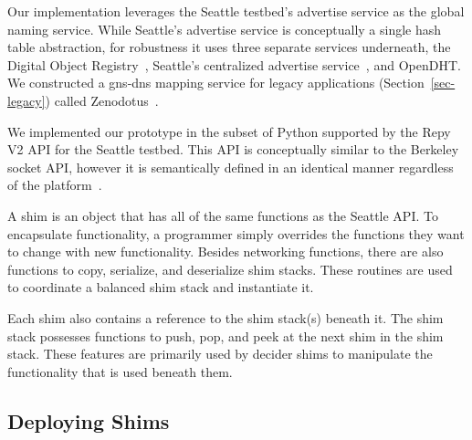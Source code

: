 Our implementation leverages the Seattle testbed's advertise service as the
global naming service.
While Seattle's advertise service is conceptually
a single hash table abstraction, for robustness it uses three separate 
services underneath, the Digital Object Registry~\cite{dor}, Seattle's
centralized advertise service~\cite{centralizedadvertise}, and 
OpenDHT\cite{Rhea_SIGCOMM_2005}.   We constructed a gns-dns mapping
service for legacy applications (Section~\ref{sec-legacy}) called
Zenodotus~\cite{Zenodotus}.

We implemented our prototype in the subset of Python supported by the Repy V2 
API for the Seattle testbed.  This API is conceptually similar to the 
Berkeley socket API, however it is 
semantically defined in an identical manner regardless of the 
platform~\cite{FutureRepyAPI}.   


A shim is an object that has all of the same functions as the Seattle API.
To encapsulate functionality, a programmer simply overrides the functions they
want to change with new functionality.   Besides networking functions, 
there are also functions to copy, serialize, and deserialize shim stacks.   
These routines are used to coordinate a balanced shim stack
and instantiate it.  

Each shim also contains a reference to the shim stack(s) beneath it.   The shim stack 
possesses functions to push, pop, and peek at the next shim in the shim 
stack.   These features are primarily used by decider shims to manipulate
the functionality that is used beneath them.   

\subsection{Deploying Shims}
\label{sec-add-application}




